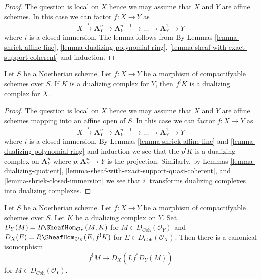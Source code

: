 \begin{proof}
The question is local on $X$ hence we may assume that $X$ and $Y$ are
affine schemes. In this case we can factor $f : X \to Y$ as
$$
X \xrightarrow{i} \mathbf{A}^n_Y \to \mathbf{A}^{n - 1}_Y \to \ldots \to
\mathbf{A}^1_Y \to Y
$$
where $i$ is a closed immersion. The lemma follows from
By Lemmas \ref{lemma-shriek-affine-line},
\ref{lemma-dualizing-polynomial-ring},
\ref{lemma-sheaf-with-exact-support-coherent} and induction.
\end{proof}

\begin{lemma}
\label{lemma-shriek-dualizing}
Let $S$ be a Noetherian scheme. Let $f : X \to Y$ be a morphism
of compactifyable schemes over $S$. If $K$ is a dualizing complex
for $Y$, then $f^!K$ is a dualizing complex for $X$.
\end{lemma}

\begin{proof}
The question is local on $X$ hence we may assume that $X$ and $Y$ are
affine schemes mapping into an affine open of $S$. In this case
we can factor $f : X \to Y$ as
$$
X \xrightarrow{i} \mathbf{A}^n_Y \to \mathbf{A}^{n - 1}_Y \to \ldots \to
\mathbf{A}^1_Y \to Y
$$
where $i$ is a closed immersion. By Lemmas \ref{lemma-shriek-affine-line} and
\ref{lemma-dualizing-polynomial-ring} and induction we see that
the $p^!K$ is a dualizing complex on $\mathbf{A}^n_Y$ where
$p : \mathbf{A}^n_Y \to Y$ is the projection. Similarly, by
Lemmas \ref{lemma-dualizing-quotient},
\ref{lemma-sheaf-with-exact-support-quasi-coherent}, and
\ref{lemma-shriek-closed-immersion} we see that $i^!$
transforms dualizing complexes into dualizing complexes.
\end{proof}

\begin{lemma}
\label{lemma-shriek-via-duality}
Let $S$ be a Noetherian scheme. Let $f : X \to Y$ be a morphism
of compactifyable schemes over $S$. Let $K$ be a dualizing complex
on $Y$. Set $D_Y(M) = R\SheafHom_{\mathcal{O}_Y}(M, K)$ for
$M \in D_{\textit{Coh}}(\mathcal{O}_Y)$ and
$D_X(E) = R\SheafHom_{\mathcal{O}_X}(E, f^!K)$ for
$E \in D_{\textit{Coh}}(\mathcal{O}_X)$. Then there is a canonical
isomorphism
$$
f^!M \longrightarrow D_X(Lf^*D_Y(M))
$$
for $M \in D_{\textit{Coh}}^+(\mathcal{O}_Y)$.
\end{lemma}

